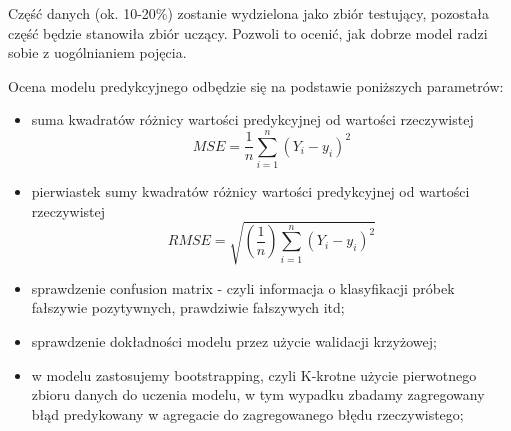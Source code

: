 Część danych (ok. 10-20\%) zostanie wydzielona jako zbiór testujący, pozostała część będzie stanowiła zbiór uczący. Pozwoli to ocenić, jak dobrze model radzi sobie z uogólnianiem pojęcia.

Ocena modelu predykcyjnego odbędzie się na podstawie poniższych parametrów:
\begin{itemize}
    \item suma kwadratów różnicy wartości predykcyjnej od wartości rzeczywistej
    \begin{equation}
    MSE = {\frac{1}{n}\sum_{i=1}^{n}(Y_{i} - y_{i})^{2}}
    \end{equation}
    \item pierwiastek sumy kwadratów różnicy wartości predykcyjnej od wartości rzeczywistej
    \begin{equation}
    RMSE = \sqrt{(\frac{1}{n})\sum_{i=1}^{n}(Y_{i} - y_{i})^{2}}
    \end{equation}
    \item sprawdzenie confusion matrix - czyli informacja o klasyfikacji próbek fałszywie pozytywnych, prawdziwie fałszywych itd;
    \item sprawdzenie dokładności modelu przez użycie walidacji krzyżowej;
    \item w modelu zastosujemy bootstrapping, czyli K-krotne użycie pierwotnego zbioru danych do uczenia modelu, w tym wypadku zbadamy zagregowany błąd predykowany w agregacie do zagregowanego błędu rzeczywistego;
\end{itemize}
